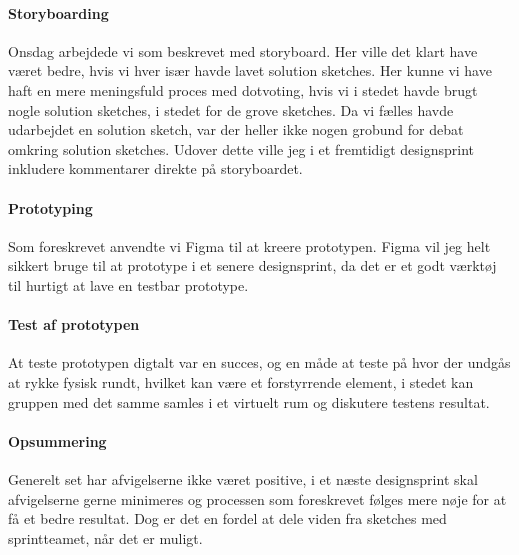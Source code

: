 \documentclass{article}
\begin{document}
\paragraph{Storyboarding} Onsdag arbejdede vi som beskrevet med storyboard. Her
ville det klart have været bedre, hvis vi hver især havde lavet solution
sketches. Her kunne vi have haft en mere meningsfuld proces med dotvoting, hvis
vi i stedet havde brugt nogle solution sketches, i stedet for de grove sketches.
Da vi fælles havde udarbejdet en solution sketch, var der heller ikke nogen
grobund for debat omkring solution sketches.  Udover dette ville jeg i et
fremtidigt designsprint inkludere kommentarer direkte på storyboardet.

\paragraph{Prototyping}
Som foreskrevet anvendte vi Figma til at kreere prototypen. Figma vil jeg helt
sikkert bruge til at prototype i et senere designsprint, da det er et godt
værktøj til hurtigt at lave en testbar prototype.

\paragraph{Test af prototypen}
At teste prototypen digtalt var en succes, og en måde at teste på hvor der
undgås at rykke fysisk rundt, hvilket kan være et forstyrrende element, i stedet
kan gruppen med det samme samles i et virtuelt rum og diskutere testens
resultat.

\paragraph{Opsummering}
Generelt set har afvigelserne ikke været positive, i et næste designsprint skal
afvigelserne gerne minimeres og processen som foreskrevet følges mere nøje for
at få et bedre resultat. Dog er det en fordel at dele viden fra sketches med
sprintteamet, når det er muligt.
\end{document}
